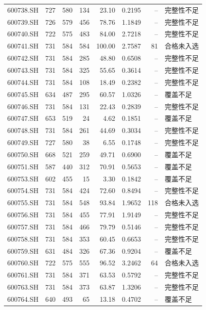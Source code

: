 \documentclass[10pt,a4paper]{article}
\begin{document}
\begin{longtable}{lrrr r r r l}
600738.SH & 727 & 580 & 134 & 23.10 & 0.2195 & -- & 完整性不足\\
600739.SH & 726 & 579 & 456 & 78.76 & 1.1849 & -- & 完整性不足\\
600740.SH & 722 & 575 & 483 & 84.00 & 2.7218 & -- & 完整性不足\\
600741.SH & 731 & 584 & 584 & 100.00 & 2.7587 & 81 & 合格未入选\\
600742.SH & 731 & 584 & 285 & 48.80 & 0.6508 & -- & 完整性不足\\
600743.SH & 731 & 584 & 325 & 55.65 & 0.3614 & -- & 完整性不足\\
600744.SH & 731 & 584 & 108 & 18.49 & 0.2382 & -- & 完整性不足\\
600745.SH & 634 & 487 & 295 & 60.57 & 1.0326 & -- & 覆盖不足\\
600746.SH & 731 & 584 & 131 & 22.43 & 0.2839 & -- & 完整性不足\\
600747.SH & 653 & 519 & 24 & 4.62 & 0.1851 & -- & 覆盖不足\\
600748.SH & 731 & 584 & 261 & 44.69 & 0.3034 & -- & 完整性不足\\
600749.SH & 727 & 580 & 38 & 6.55 & 0.1748 & -- & 完整性不足\\
600750.SH & 668 & 521 & 259 & 49.71 & 0.6900 & -- & 覆盖不足\\
600751.SH & 587 & 440 & 312 & 70.91 & 0.5653 & -- & 覆盖不足\\
600753.SH & 602 & 455 & 15 & 3.30 & 0.1842 & -- & 覆盖不足\\
600754.SH & 731 & 584 & 424 & 72.60 & 0.8494 & -- & 完整性不足\\
600755.SH & 731 & 584 & 548 & 93.84 & 1.9652 & 118 & 合格未入选\\
600756.SH & 731 & 584 & 455 & 77.91 & 1.9149 & -- & 完整性不足\\
600757.SH & 731 & 584 & 466 & 79.79 & 0.5146 & -- & 完整性不足\\
600758.SH & 731 & 584 & 353 & 60.45 & 0.6653 & -- & 完整性不足\\
600759.SH & 631 & 484 & 326 & 67.36 & 0.9204 & -- & 覆盖不足\\
600760.SH & 722 & 575 & 555 & 96.52 & 3.2462 & 64 & 合格未入选\\
600761.SH & 731 & 584 & 371 & 63.53 & 0.5792 & -- & 完整性不足\\
600763.SH & 731 & 584 & 373 & 63.87 & 1.3206 & -- & 完整性不足\\
600764.SH & 640 & 493 & 65 & 13.18 & 0.4702 & -- & 覆盖不足\\

\end{longtable}
\end{document}

